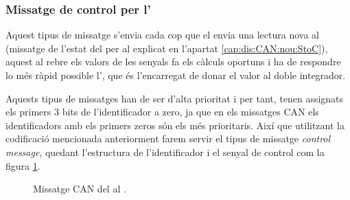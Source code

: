 \subsubsection{Missatge de control per l'\Actuador}\label{cap:dis:CAN:nou:CtoA}

Aquest tipus de missatge s'envia cada cop que el \Sensor envia una lectura nova al \Controlador (missatge de l'estat del \Sensor per al \Controlador explicat en l'apartat \ref{cap:dis:CAN:nou:StoC}), aquest al rebre els valors de les senyals fa els càlculs oportuns i ha de respondre lo més ràpid possible l'\Actuador, que és l'encarregat de donar el valor al doble integrador.

Aquests tipus de missatges han de ser d'alta prioritat i per tant, tenen assignats els primers 3 bits de l'identificador a zero, ja que en els missatges CAN els identificadors amb els primers zeros són els més prioritaris. Així que utilitzant la codificació mencionada anteriorment farem servir el tipus de missatge \emph{control message}, quedant l'estructura de l'identificador i el senyal de control com la figura \ref{fig:bit_encoding:CAN:nou:CtoA}.

\begin{figure}[ht!]
	
    \caption{Missatge CAN del \Controlador al \Actuador.}
    \label{fig:bit_encoding:CAN:nou:CtoA}
\end{figure}


